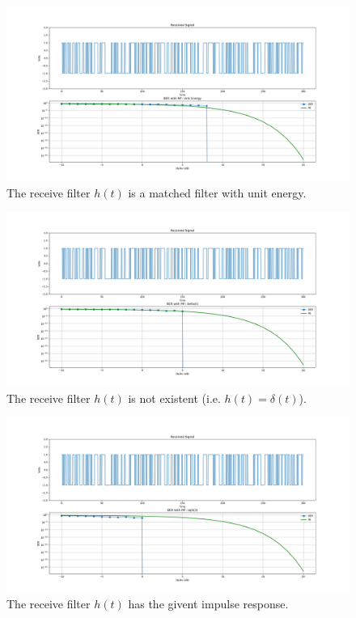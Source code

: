 \documentclass[
	12pt, %
	oneside
]{fphw}
\begin{document}
\begin{figure}[hp]
	\centering
	\includegraphics[width=17cm]{../graphs/1}
	\caption{The receive filter $h(t)$ is a matched filter with unit energy.}
	\label{plot:ber1}
\end{figure}

\begin{figure}[hp]
	\centering
	\includegraphics[width=17cm]{../graphs/2}
	\caption{The receive filter $h(t)$ is not existent (i.e. $h(t) = \delta(t)$).}
	\label{plot:ber2}
\end{figure}

\begin{figure}[hp]
	\centering
	\includegraphics[width=17cm]{../graphs/3}
	\caption{The receive filter $h(t)$ has the givent impulse response.}
	\label{plot:ber3}
\end{figure}
\end{document}

